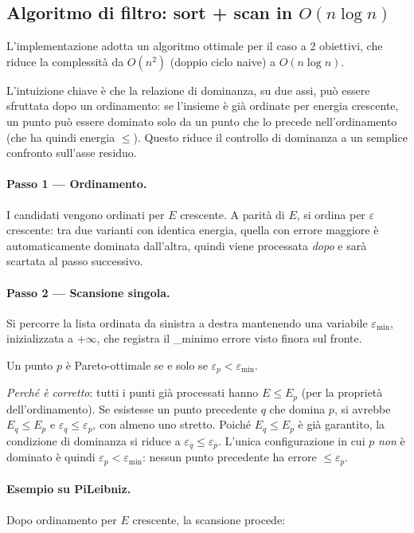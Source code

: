 \documentclass[a4paper,12pt]{article}
\begin{document}
\subsection{Algoritmo di filtro: sort + scan in $O(n \log n)$}

L'implementazione adotta un algoritmo ottimale per il caso a 2 obiettivi,
che riduce la complessità da $O(n^2)$ (doppio ciclo naive) a
$O(n \log n)$.

L'intuizione chiave è che la relazione di dominanza, su due assi,
può essere sfruttata dopo un ordinamento: se l'insieme è già
ordinate per energia crescente, un punto può essere dominato
solo da un punto che lo precede nell'ordinamento (che ha quindi
energia $\le$). Questo riduce il controllo di dominanza a
un semplice confronto sull'asse residuo.

\paragraph{Passo 1 --- Ordinamento.}
I candidati vengono ordinati per $E$ crescente.
A parità di $E$, si ordina per $\varepsilon$ crescente: tra due
varianti con identica energia, quella con errore maggiore è
automaticamente dominata dall'altra, quindi viene processata
\emph{dopo} e sarà scartata al passo successivo.

\paragraph{Passo 2 --- Scansione singola.}
Si percorre la lista ordinata da sinistra a destra mantenendo una
variabile $\varepsilon_{\min}$, inizializzata a $+\infty$, che
registra il \_minimo errore visto finora sul fronte.

Un punto $p$ è Pareto-ottimale se e solo se
$\varepsilon_p < \varepsilon_{\min}$.

\textit{Perché è corretto}: tutti i punti già processati hanno
$E \le E_p$ (per la proprietà dell'ordinamento).
Se esistesse un punto precedente $q$ che domina $p$, si avrebbe
$E_q \le E_p$ e $\varepsilon_q \le \varepsilon_p$, con almeno uno
stretto. Poiché $E_q \le E_p$ è già garantito, la condizione di
dominanza si riduce a $\varepsilon_q \le \varepsilon_p$.
L'unica configurazione in cui $p$ \emph{non} è dominato è quindi
$\varepsilon_p < \varepsilon_{\min}$: nessun punto precedente ha
errore $\le \varepsilon_p$.

\paragraph{Esempio su PiLeibniz.}
Dopo ordinamento per $E$ crescente, la scansione procede:
\end{document}
